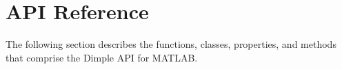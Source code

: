 \section{API Reference}

The following section describes the functions, classes, properties, and methods that comprise the Dimple API for MATLAB.









